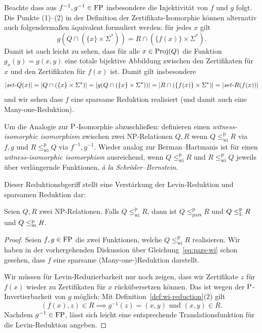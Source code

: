 Beachte dass aus $f^{-1},g^{-1}\in\FP$ insbesondere die Injektivität von $f$ und $g$ folgt.
Die Punkte (1)–(2) in der Definition der Zertifikats-Isomorphie können alternativ auch folgendermaßen äquivalent formuliert werden:  für jedes $x$ gilt
\begin{equation}\label{eq:pars-wi} g(Q\cap(\{x\}\times\Sigma^*))  = R \cap (\{f(x)\}\times\Sigma^*).  \end{equation}
Damit ist auch leicht zu sehen, dass für alle $x\in\Proj(Q)$ die Funktion $g_x(y)= g(x,y)$ eine totale bijektive Abbildung zwischen den Zertifikaten für $x$ und den Zertifikaten für $f(x)$ ist. 
Damit gilt insbesondere
\[ |\fset{}Q(x)|=|Q\cap(\{x\}\times\Sigma^*)|=|g(Q\cap(\{x\}\times\Sigma^*))|=|R \cap (\{f(x)\}\times\Sigma^*)|=|\fset{}R(f(x))| \]
und wir sehen dass $f$ eine sparsame Reduktion realisiert (und damit auch eine Many-one-Reduktion).

Um die Analogie zur $\P$-Isomorphie abzuschließen: \citeauthor{wiedermann_witness-isomorphic_1995} definieren einen \emph{witness-isomorphic isomorphism} zwischen zwei NP-Relationen $Q, R$ wenn $Q\leq_\mathrm{wi}^\mathrm p R$ via $f,g$ und $R\leq_\mathrm{wi}^\mathrm p Q$ via $f^{-1}, g^{-1}$. Wieder analog zur Berman–Hartmanis ist für einen \emph{witness-isomorphic isomorphism} ausreichend, wenn $Q\leq_\mathrm{wi}^\mathrm p R$ und $R\leq_\mathrm{wi}^\mathrm p Q$ jeweils über verlängernde Funktionen, \emph{à la Schröder–Bernstein}.

Dieser Reduktionsbgeriff stellt eine Verstärkung der Levin-Reduktion und sparsamen Reduktion dar:
\begin{lemma}\label{lemma:wi-reduction}
    Seien $Q, R$ zwei NP-Relationen. Falls $Q\leq_\mathrm{wi}^\mathrm p R$, dann ist $Q\leq_\mathrm{pars}^\mathrm p R$ und $Q\leqlp R$ und $Q\leqmp R$.
\end{lemma}
\begin{proof}
    Seien $f,g\in \FP$ die zwei Funktionen, welche $Q\leq_\mathrm{wi}^\mathrm p R$ realisieren.
    Wir haben in der vorhergehenden Diskussion über Gleichung~\ref{eq:pars-wi} schon gesehen, dass $f$ eine sparsame (Many-one-)Reduktion darstellt.

    Wir müssen für Levin-Reduzierbarkeit nur noch zeigen, dass wir Zertifikate $z$ für $f(x)$ wieder zu Zertifikaten für $x$ rückübersetzen können. Das ist wegen der $\P$-Invertierbarkeit von $g$ möglich:
    Mit Definition~\ref{def:wi-reduction}(2) gilt
    \[ (f(x), z) \in R \implies g^{-1}(z)=(x,y) \text{ und } (x,y)\in R. \]
    Nachdem $g^{-1}\in\FP$, lässt sich leicht eine entsprechende Translationsfunktion für die Levin-Reduktion angeben.
\end{proof}

